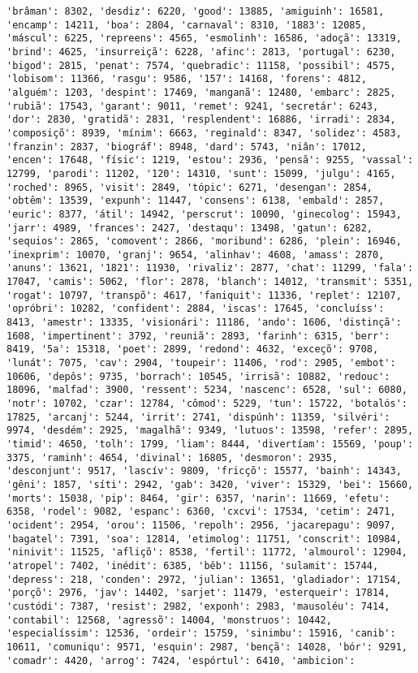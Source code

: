\begin{Verbatim}[commandchars=\\\{\}]
'brâman': 8302, 'desdiz': 6220, 'good': 13885, 'amiguinh': 16581, 'encamp': 14211, 'boa': 2804, 'carnaval': 8310, '1883': 12085, 'máscul': 6225, 'repreens': 4565, 'esmolinh': 16586, 'adoçã': 13319, 'brind': 4625, 'insurreiçã': 6228, 'afinc': 2813, 'portugal': 6230, 'bigod': 2815, 'penat': 7574, 'quebradic': 11158, 'possibil': 4575, 'lobisom': 11366, 'rasgu': 9586, '157': 14168, 'forens': 4812, 'alguém': 1203, 'despint': 17469, 'manganã': 12480, 'embarc': 2825, 'rubiã': 17543, 'garant': 9011, 'remet': 9241, 'secretár': 6243, 'dor': 2830, 'gratidã': 2831, 'resplendent': 16886, 'irradi': 2834, 'composiçõ': 8939, 'mínim': 6663, 'reginald': 8347, 'solidez': 4583, 'franzin': 2837, 'biográf': 8948, 'dard': 5743, 'niân': 17012, 'encen': 17648, 'físic': 1219, 'estou': 2936, 'pensã': 9255, 'vassal': 12799, 'parodi': 11202, '120': 14310, 'sunt': 15099, 'julgu': 4165, 'roched': 8965, 'visit': 2849, 'tópic': 6271, 'desengan': 2854, 'obtêm': 13539, 'expunh': 11447, 'consens': 6138, 'embald': 2857, 'euric': 8377, 'átil': 14942, 'perscrut': 10090, 'ginecolog': 15943, 'jarr': 4989, 'frances': 2427, 'destaqu': 13498, 'gatun': 6282, 'sequios': 2865, 'comovent': 2866, 'moribund': 6286, 'plein': 16946, 'inexprim': 10070, 'granj': 9654, 'alinhav': 4608, 'amass': 2870, 'anuns': 13621, '1821': 11930, 'rivaliz': 2877, 'chat': 11299, 'fala': 17047, 'camis': 5062, 'flor': 2878, 'blanch': 14012, 'transmit': 5351, 'rogat': 10797, 'transpõ': 4617, 'faniquit': 11336, 'replet': 12107, 'opróbri': 10282, 'confident': 2884, 'iscas': 17645, 'concluíss': 8413, 'amestr': 13335, 'visionári': 11186, 'ando': 1606, 'distinçã': 1608, 'impertinent': 3792, 'reuniã': 2893, 'farinh': 6315, 'berr': 8419, '5a': 15318, 'poet': 2899, 'redond': 4632, 'exceçõ': 9708, 'lunát': 7075, 'cav': 2904, 'toupeir': 11406, 'rod': 2905, 'embot': 10606, 'depôs': 9735, 'borrach': 10545, 'irrisã': 10882, 'redouc': 18096, 'malfad': 3900, 'ressent': 5234, 'nascenc': 6528, 'sul': 6080, 'notr': 10702, 'czar': 12784, 'cômod': 5229, 'tun': 15722, 'botalós': 17825, 'arcanj': 5244, 'irrit': 2741, 'dispúnh': 11359, 'silvéri': 9974, 'desdém': 2925, 'magalhã': 9349, 'lutuos': 13598, 'refer': 2895, 'timid': 4650, 'tolh': 1799, 'liam': 8444, 'divertíam': 15569, 'poup': 3375, 'raminh': 4654, 'divinal': 16805, 'desmoron': 2935, 'desconjunt': 9517, 'lascív': 9809, 'fricçõ': 15577, 'bainh': 14343, 'gêni': 1857, 'síti': 2942, 'gab': 3420, 'viver': 15329, 'bei': 15660, 'morts': 15038, 'pip': 8464, 'gir': 6357, 'narin': 11669, 'efetu': 6358, 'rodel': 9082, 'espanc': 6360, 'cxcvi': 17534, 'cetim': 2471, 'ocident': 2954, 'orou': 11506, 'repolh': 2956, 'jacarepagu': 9097, 'bagatel': 7391, 'soa': 12814, 'etimolog': 11751, 'conscrit': 10984, 'ninivit': 11525, 'afliçõ': 8538, 'fertil': 11772, 'almourol': 12904, 'atropel': 7402, 'inédit': 6385, 'bêb': 11156, 'sulamit': 15744, 'depress': 218, 'conden': 2972, 'julian': 13651, 'gladiador': 17154, 'porçõ': 2976, 'jav': 14402, 'sarjet': 11479, 'esterqueir': 17814, 'custódi': 7387, 'resist': 2982, 'exponh': 2983, 'mausoléu': 7414, 'contabil': 12568, 'agressõ': 14004, 'monstruos': 10442, 'especialíssim': 12536, 'ordeir': 15759, 'sinimbu': 15916, 'canib': 10611, 'comuniqu': 9571, 'esquin': 2987, 'bençã': 14028, 'bór': 9291, 'comadr': 4420, 'arrog': 7424, 'espórtul': 6410, 'ambicion': 
\end{Verbatim}
